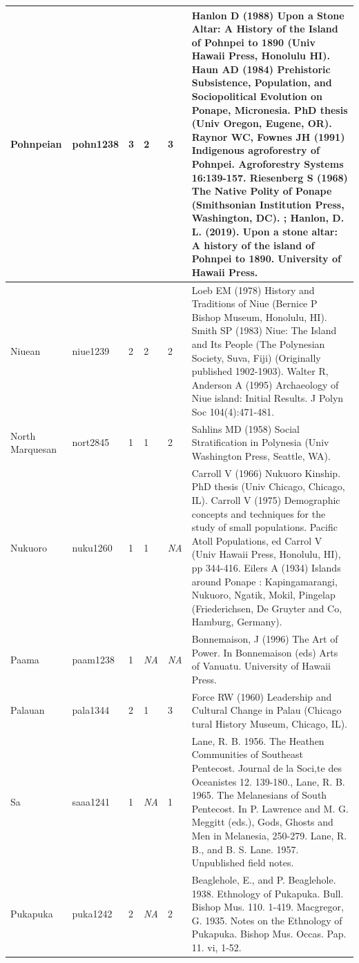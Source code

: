 \documentclass[draft,10pt]{article} %
\begin{document}
\begin{landscape}
\begin{longtable}{ | p{2cm}| p{2cm}| p{1.8cm}| p{1.8cm}| p{3cm}| p{9cm}| }
Pohnpeian&pohn1238&3&2&3&Hanlon D (1988) Upon a Stone Altar: A History of the Island of Pohnpei to 1890 (Univ Hawaii Press, Honolulu HI). Haun AD (1984) Prehistoric Subsistence, Population, and Sociopolitical Evolution on Ponape, Micronesia. PhD thesis (Univ Oregon, Eugene, OR). Raynor WC, Fownes JH (1991) Indigenous agroforestry of Pohnpei. Agroforestry Systems 16:139-157. Riesenberg S (1968) The Native Polity of Ponape (Smithsonian Institution Press, Washington, DC). ; Hanlon, D. L. (2019). Upon a stone altar: A history of the island of Pohnpei to 1890. University of Hawaii Press.\\ \hline
Niuean&niue1239&2&2&2&Loeb EM (1978) History and Traditions of Niue (Bernice P Bishop Museum, Honolulu, HI). Smith SP (1983) Niue: The Island and Its People (The Polynesian Society, Suva, Fiji) (Originally published 1902-1903). Walter R, Anderson A (1995) Archaeology of Niue island: Initial Results. J Polyn Soc 104(4):471-481. \\ \hline
North Marquesan&nort2845&1&1&2&Sahlins MD (1958) Social Stratification in Polynesia (Univ Washington Press, Seattle, WA).\\ \hline
Nukuoro&nuku1260&1&1&\emph{NA}&Carroll V (1966) Nukuoro Kinship. PhD thesis (Univ Chicago, Chicago, IL). Carroll V (1975) Demographic concepts and techniques for the study of small populations. Pacific Atoll Populations, ed Carrol V (Univ Hawaii Press, Honolulu, HI), pp 344-416. Eilers A (1934) Islands around Ponape : Kapingamarangi, Nukuoro, Ngatik, Mokil, Pingelap (Friederichsen, De Gruyter and Co, Hamburg, Germany). \\ \hline
Paama&paam1238&1&\emph{NA}&\emph{NA}&Bonnemaison, J (1996) The Art of Power. In Bonnemaison (eds) Arts of Vanuatu. University of Hawaii Press.\\ \hline
Palauan&pala1344&2&1&3&Force RW (1960) Leadership and Cultural Change in Palau (Chicago tural History Museum, Chicago, IL).\\ \hline
Sa&saaa1241&1&\emph{NA}&1&Lane, R. B. 1956. The Heathen Communities of Southeast Pentecost. Journal de la Soci‚te des Oceanistes 12. 139-180., Lane, R. B. 1965. The Melanesians of South Pentecost. In P. Lawrence and M. G. Meggitt (eds.), Gods, Ghosts and Men in Melanesia, 250-279. Lane, R. B., and B. S. Lane. 1957. Unpublished field notes.\\ \hline
Pukapuka&puka1242&2&\emph{NA}&2&Beaglehole, E., and P. Beaglehole. 1938. Ethnology of Pukapuka. Bull. Bishop Mus. 110. 1-419. Macgregor, G. 1935. Notes on the Ethnology of Pukapuka. Bishop Mus. Occas. Pap. 11. vi, 1-52.\\ \hline

\end{longtable}
\end{landscape}
\end{document}
